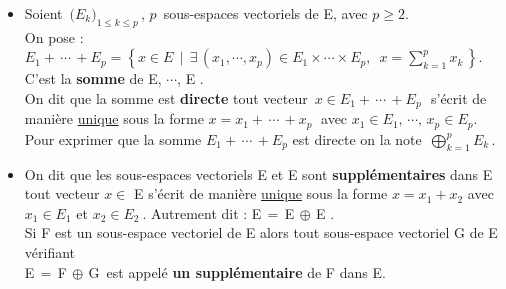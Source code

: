 \begin{itemize}[leftmargin=0.5cm, label=•]
    \item Soient \(\,\bigl(E_k\bigr)_{1\leq k\leq p}\,\), $p\,$ sous-espaces vectoriels de E, avec $p\geq 2$.\\
    On pose : \(\displaystyle E_1 + \,\cdots\, + E_p=\left\{x\in E\ \ \vert \ \ \exists\,(x_1,\cdots,x_p)\in E_1\times \cdots \times E_p, \ \; x=\sum_{k=1}^px_k\,\right\}\).\vspace{0.15cm}\\
    C'est la \textbf{somme} de E, $\cdots$, E .\vspace{0.1cm} \\
    On dit que la somme est \textbf{directe} \ssi tout vecteur \(\,x\in E_1 + \,\cdots\, + E_p\,\)\ s'écrit de\\
    manière \underline{unique} sous la forme \(x=x_1 + \,\cdots\,+ x_p\;\) avec \(x_1\in E_1,\, \cdots,\, x_p\in E_p\).\\ 
    Pour exprimer que la somme \(E_1 + \,\cdots\, + E_p\) est directe on la note \(\,\displaystyle\bigoplus_{k=1}^p E_k \,\).\vspace{0.3cm}\\


    \item On dit que les sous-espaces vectoriels E et E sont \textbf{supplémentaires} dans E \ssi tout vecteur \(x\in\) E s'écrit de manière \underline{unique} sous la forme \(x=x_1 + x_2\)  avec \( x_1 \in  E_1 \) et \( x_2 \in  E_2\ \). Autrement dit : E\,$=$\,E\(\,\oplus\,\)E\vspace{0.1cm} .\vspace{0.1cm}\\
    Si F est un sous-espace vectoriel de E alors tout sous-espace vectoriel G de E vérifiant\\
    E\,$=$\,F\(\,\oplus\,\)G\ est appelé \textbf{un supplémentaire} de F dans E.
\end{itemize}

\vspace{1cm}

